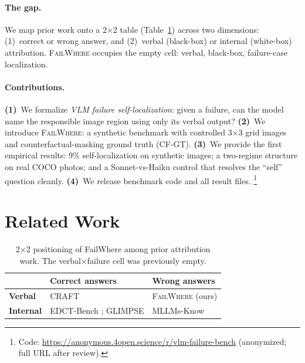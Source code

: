 \documentclass[11pt]{article}
\begin{document}
\paragraph{The gap.}
We map prior work onto a 2$\times$2 table
(Table~\ref{tab:2x2}) across two dimensions:
(1)~correct or wrong answer, and
(2)~verbal (black-box) or internal (white-box) attribution.
\textsc{FailWhere} occupies the empty cell: verbal, black-box, failure-case localization.

\paragraph{Contributions.}
\textbf{(1)}~We formalize \emph{VLM failure self-localization}: given a failure,
can the model name the responsible image region using only its verbal output?
\textbf{(2)}~We introduce \textsc{FailWhere}: a synthetic benchmark with controlled
3$\times$3 grid images and counterfactual-masking ground truth (CF-GT).
\textbf{(3)}~We provide the first empirical results:
9\% self-localization on synthetic images;
a two-regime structure on real COCO photos;
and a Sonnet-vs-Haiku control that resolves the ``self'' question cleanly.
\textbf{(4)}~We release benchmark code and all result files.%
\footnote{Code: \url{https://anonymous.4open.science/r/vlm-failure-bench}
(anonymized; full URL after review).}


\section{Related Work}

\begin{table}[t]
\centering
\small
\begin{tabular}{lll}
\toprule
 & Correct answers & \textbf{Wrong answers} \\
\midrule
\textbf{Verbal} & CRAFT \citep{parcalabescu-frank-2023-craft} & \textsc{FailWhere} (ours) \\
\textbf{Internal} & EDCT-Bench \citep{zang-2026-edct}; GLIMPSE & MLLMs-Know \citep{zhang-2025-mllms} \\
\bottomrule
\end{tabular}
\caption{2$\times$2 positioning of FailWhere among prior attribution work.
The verbal$\times$failure cell was previously empty.}
\label{tab:2x2}
\end{table}
\end{document}
